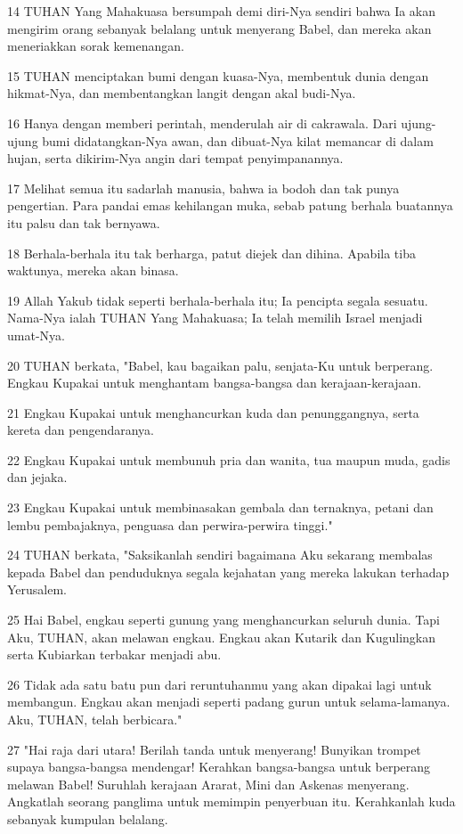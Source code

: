 \par 14 TUHAN Yang Mahakuasa bersumpah demi diri-Nya sendiri bahwa Ia akan mengirim orang sebanyak belalang untuk menyerang Babel, dan mereka akan meneriakkan sorak kemenangan.
\par 15 TUHAN menciptakan bumi dengan kuasa-Nya, membentuk dunia dengan hikmat-Nya, dan membentangkan langit dengan akal budi-Nya.
\par 16 Hanya dengan memberi perintah, menderulah air di cakrawala. Dari ujung-ujung bumi didatangkan-Nya awan, dan dibuat-Nya kilat memancar di dalam hujan, serta dikirim-Nya angin dari tempat penyimpanannya.
\par 17 Melihat semua itu sadarlah manusia, bahwa ia bodoh dan tak punya pengertian. Para pandai emas kehilangan muka, sebab patung berhala buatannya itu palsu dan tak bernyawa.
\par 18 Berhala-berhala itu tak berharga, patut diejek dan dihina. Apabila tiba waktunya, mereka akan binasa.
\par 19 Allah Yakub tidak seperti berhala-berhala itu; Ia pencipta segala sesuatu. Nama-Nya ialah TUHAN Yang Mahakuasa; Ia telah memilih Israel menjadi umat-Nya.
\par 20 TUHAN berkata, "Babel, kau bagaikan palu, senjata-Ku untuk berperang. Engkau Kupakai untuk menghantam bangsa-bangsa dan kerajaan-kerajaan.
\par 21 Engkau Kupakai untuk menghancurkan kuda dan penunggangnya, serta kereta dan pengendaranya.
\par 22 Engkau Kupakai untuk membunuh pria dan wanita, tua maupun muda, gadis dan jejaka.
\par 23 Engkau Kupakai untuk membinasakan gembala dan ternaknya, petani dan lembu pembajaknya, penguasa dan perwira-perwira tinggi."
\par 24 TUHAN berkata, "Saksikanlah sendiri bagaimana Aku sekarang membalas kepada Babel dan penduduknya segala kejahatan yang mereka lakukan terhadap Yerusalem.
\par 25 Hai Babel, engkau seperti gunung yang menghancurkan seluruh dunia. Tapi Aku, TUHAN, akan melawan engkau. Engkau akan Kutarik dan Kugulingkan serta Kubiarkan terbakar menjadi abu.
\par 26 Tidak ada satu batu pun dari reruntuhanmu yang akan dipakai lagi untuk membangun. Engkau akan menjadi seperti padang gurun untuk selama-lamanya. Aku, TUHAN, telah berbicara."
\par 27 "Hai raja dari utara! Berilah tanda untuk menyerang! Bunyikan trompet supaya bangsa-bangsa mendengar! Kerahkan bangsa-bangsa untuk berperang melawan Babel! Suruhlah kerajaan Ararat, Mini dan Askenas menyerang. Angkatlah seorang panglima untuk memimpin penyerbuan itu. Kerahkanlah kuda sebanyak kumpulan belalang.
